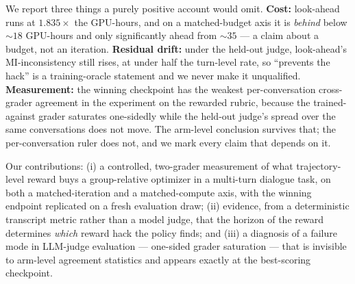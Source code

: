 We report three things a purely positive account would omit. \textbf{Cost:} look-ahead runs at
$1.835\times$ the GPU-hours, and on a matched-budget axis it is \emph{behind} below ${\sim}18$
GPU-hours and only significantly ahead from ${\sim}35$ --- a claim about a budget, not an
iteration. \textbf{Residual drift:} under the held-out judge, look-ahead's MI-inconsistency still
rises, at under half the turn-level rate, so ``prevents the hack'' is a training-oracle statement
and we never make it unqualified. \textbf{Measurement:} the winning checkpoint has the weakest
per-conversation cross-grader agreement in the experiment on the rewarded rubric, because the
trained-against grader saturates one-sidedly while the held-out judge's spread over the same
conversations does not move. The arm-level conclusion survives that; the per-conversation ruler
does not, and we mark every claim that depends on it.

Our contributions: (i) a controlled, two-grader measurement of what trajectory-level reward buys a
group-relative optimizer in a multi-turn dialogue task, on both a matched-iteration and a
matched-compute axis, with the winning endpoint replicated on a fresh evaluation draw; (ii)
evidence, from a deterministic transcript metric rather than a model
judge, that the horizon of the reward determines \emph{which} reward hack the policy finds; and
(iii) a diagnosis of a failure mode in LLM-judge evaluation --- one-sided grader saturation ---
that is invisible to arm-level agreement statistics and appears exactly at the best-scoring
checkpoint.
